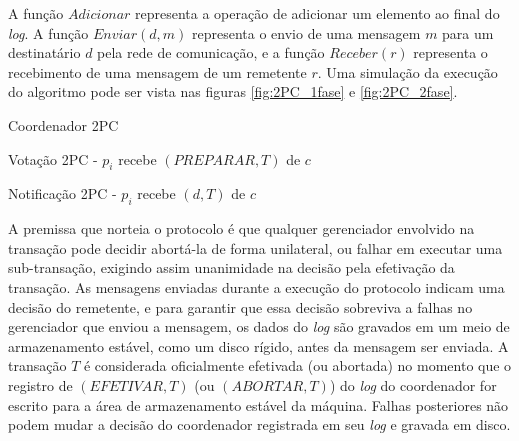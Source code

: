 \documentclass[11pt,twoside,a4paper]{book}
\begin{document}
A função $Adicionar$ representa a operação de adicionar um elemento ao final do \emph{log}. A função $Enviar(d, m)$ representa o envio de uma mensagem $m$ para um destinatário $d$ pela rede de comunicação, e a função $Receber(r)$ representa o recebimento de uma mensagem de um remetente $r$. Uma simulação da execução do algoritmo pode ser vista nas figuras \ref{fig:2PC_1fase} e \ref{fig:2PC_2fase}.

\begin{algorithm}
\caption{Coordenador 2PC}
\label{alg:2pc_coordenador}
\end{algorithm}

\begin{algorithm}
\caption{Votação 2PC - $p_i$ recebe $(PREPARAR, T)$ de $c$}
\label{alg:2pc_participante1}
\end{algorithm}

\begin{algorithm}
\caption{Notificação 2PC - $p_i$ recebe $(d, T)$ de $c$}
\label{alg:2pc_participante2}
\end{algorithm}

A premissa que norteia o protocolo é que qualquer gerenciador envolvido na transação pode decidir abortá-la de forma unilateral, ou falhar em executar uma sub-transação, exigindo assim unanimidade na decisão pela efetivação da transação. As mensagens enviadas durante a execução do protocolo indicam uma decisão do remetente, e para garantir que essa decisão sobreviva a falhas no gerenciador que enviou a mensagem, os dados do \emph{log} são gravados em um meio de armazenamento estável, como um disco rígido, antes da  mensagem ser enviada. A transação $T$ é considerada oficialmente efetivada (ou abortada) no momento que o registro de $(EFETIVAR, T)$ (ou $(ABORTAR, T)$) do \emph{log} do coordenador for escrito para a área de armazenamento estável da máquina. Falhas posteriores não podem mudar a decisão do coordenador registrada em seu \emph{log} e gravada em disco.
\end{document}
